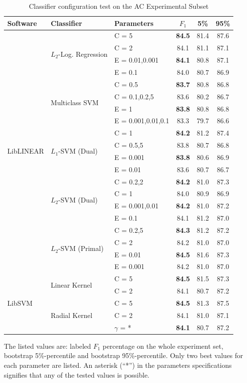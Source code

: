 \documentclass[12pt,notitlepage]{report}
\begin{document}
\begin{table}[tb]
\caption{Classifier configuration test on the AC Experimental Subset}\label{tab:ac-classifiers}\footnotesize
\begin{center}
\shorthandoff{-}
\begin{tabular}{|l|l|l|c|c|c|}\hline
\bf Software & \bf Classifier & \bf Parameters & \bf $F_1$ & \bf 5\% & \bf 95\% \\\hline
\multirow{20}{*}{LibLINEAR} & \multirow{4}{*}{$L_2$-Log. Regression} & C = 5 & \bf 84.5 & 81.4 & 87.6 \\
 & & C = 2 & 84.1 & 81.1 & 87.1 \\\cline{3-6}
 & & E = 0.01,0.001 & \bf 84.1 & 80.8 & 87.1 \\
 & & E = 0.1 & 84.0 & 80.7 & 86.9 \\\cline{2-6}
 & \multirow{4}{*}{Multiclass SVM} & C = 0.5 & \bf 83.7 & 80.8 & 86.8 \\ 
 & & C = 0.1,0.2,5 & 83.6 & 80.2 & 86.7 \\\cline{3-6}
 & & E = 1 & \bf 83.8 & 80.8 & 86.8 \\
 & & E = 0.001,0.01,0.1 & 83.3 & 79.7 & 86.6 \\\cline{2-6}
 & \multirow{4}{*}{$L_1$-SVM (Dual)} & C = 1 & \bf 84.2 & 81.2 & 87.4 \\
 & & C = 0.5,5 & 83.8 & 80.7 & 86.8 \\\cline{3-6}
 & & E = 0.001 & \bf 83.8 & 80.6 & 86.9 \\
 & & E = 0.01 & 83.6 & 80.7 & 86.7 \\\cline{2-6}
 & \multirow{4}{*}{$L_2$-SVM (Dual)} & C = 0.2,2 & \bf 84.2 & 81.0 & 87.3 \\
 & & C = 1 & 84.0 & 80.9 & 86.9 \\\cline{3-6}
 & & E = 0.001,0.01 & \bf 84.2 & 81.0 & 87.2 \\
 & & E = 0.1 & 84.1 & 81.2 & 87.0 \\\cline{2-6}
 & \multirow{4}{*}{$L_2$-SVM (Primal)} & C = 0.2,5 & \bf 84.3 & 81.2 & 87.2 \\
 & & C = 2 & 84.2 & 81.0 & 87.0 \\\cline{3-6}
 & & E = 0.01 & \bf 84.5 & 81.6 & 87.3 \\
 & & E = 0.001 & 84.2 & 81.0 & 87.0 \\\hline
 \multirow{5}{*}{LibSVM} & \multirow{2}{*}{Linear Kernel} & C = 5 & \bf 84.5 & 81.5 & 87.3 \\
 & & C = 2 & 84.1 & 80.7 & 87.2 \\\cline{2-6}
 & \multirow{3}{*}{Radial Kernel} & C = 5 & \bf 84.5 & 81.3 & 87.5 \\
 & & C = 2 & 84.1 & 81.0 & 87.1 \\\cline{3-6}
 & & $\gamma$ = * & \bf 84.1 & 80.7 & 87.2 \\\hline
\end{tabular}
\shorthandon{-}
\end{center}
The listed values are: labeled $F_1$ percentage on the whole experiment set, bootstrap 5\%-percentile and bootstrap 95\%-percentile. Only two best values for each parameter are listed. An asterisk (``*'') in the parameters specifications signifies that any of the tested values is possible.
\end{table}
\end{document}
